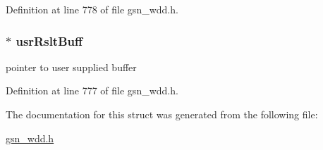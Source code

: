 Definition at line 778 of file gsn\_\-wdd.h.

\hypertarget{a00285_aee18f25ad38139fd4e5bfdb4b63640f2}{
\subsubsection[{usrRsltBuff}]{$\ast$ {\bf usrRsltBuff}}}
\label{a00285_aee18f25ad38139fd4e5bfdb4b63640f2}
pointer to user supplied buffer 

Definition at line 777 of file gsn\_\-wdd.h.



The documentation for this struct was generated from the following file:\begin{DoxyCompactItemize}
\item 
\hyperlink{a00603}{gsn\_\-wdd.h}\end{DoxyCompactItemize}
